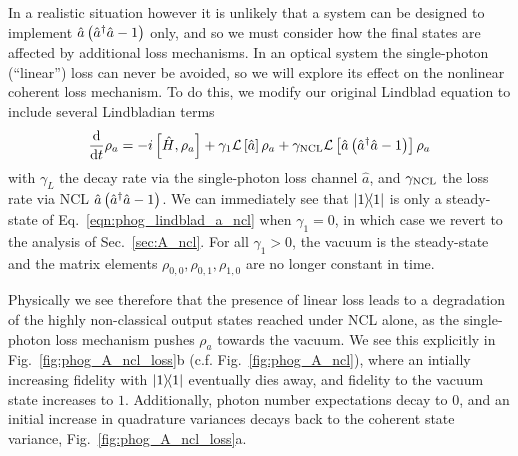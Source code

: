In a realistic situation however it is unlikely that a system can be designed to implement $\hat{a}\left(\hat{a}^\dagger \hat{a} - 1\right)$ only, and so we must consider how the final states are affected by additional loss mechanisms. In an optical system the single-photon (``linear'') loss can never be avoided, so we will explore its effect on the nonlinear coherent loss mechanism. To do this, we modify our original Lindblad equation to include several Lindbladian terms
\begin{equation}\label{eqn:phog_lindblad_a_ncl}
\frac{\mathrm{d}}{\mathrm{d}t} \rho_a =  - i \left[ \hat{H}, \rho_a\right] + \gamma_1 \mathcal{L}\left[\hat{a}\right]\rho_a + \gamma_{\text{NCL}} \mathcal{L}\left[\hat{a}\left(\hat{a}^\dagger \hat{a} - 1\right)\right]\rho_a
\end{equation}
with $\gamma_L$ the decay rate via the single-photon loss channel $\hat{a}$, and $\gamma_{\text{NCL}}$ the loss rate via NCL $\hat{a}\left(\hat{a}^\dagger \hat{a} - 1\right)$. We can immediately see that $\dyad{1}$ is only a steady-state of Eq.~\ref{eqn:phog_lindblad_a_ncl} when $\gamma_1 = 0$, in which case we revert to the analysis of Sec.~\ref{sec:A_ncl}. For all $\gamma_1 > 0$, the vacuum is the steady-state and the matrix elements $\rho_{0, 0}, \rho_{0, 1}, \rho_{1, 0}$ are no longer constant in time. 

Physically we see therefore that the presence of linear loss leads to a degradation of the highly non-classical output states reached under NCL alone, as the single-photon loss mechanism pushes $\rho_a$ towards the vacuum. We see this explicitly in Fig.~\ref{fig:phog_A_ncl_loss}b (c.f. Fig.~\ref{fig:phog_A_ncl}), where an intially increasing fidelity with $\dyad{1}$ eventually dies away, and fidelity to the vacuum state increases to $1$. Additionally, photon number expectations decay to $0$, and an initial increase in quadrature variances decays back to the coherent state variance, Fig.~\ref{fig:phog_A_ncl_loss}a.





